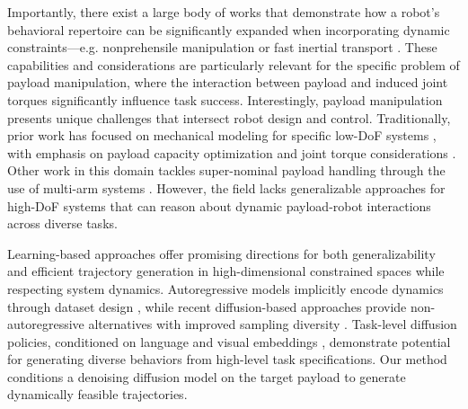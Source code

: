 Importantly, there exist a large body of works that demonstrate how a robot's behavioral repertoire can be significantly expanded when incorporating dynamic constraints---e.g. nonprehensile manipulation \cite{dogar2011framework,pasricha2022pokerrt,ruggiero2018nonprehensile,yu2016more,zeng2020tossingbot} or fast inertial transport \cite{arrizabalaga2024slosh,ichnowski2022gomp,muchacho2022solution,avigal2022gomp}.
These capabilities and considerations are particularly relevant for the specific problem of payload manipulation, where the interaction between payload and induced joint torques significantly influence task success.
Interestingly, payload manipulation presents unique challenges that intersect robot design and control.
Traditionally, prior work has focused on mechanical modeling for specific low-DoF systems \cite{wang2001payload}, with emphasis on payload capacity optimization \cite{korayem2008maximum} and joint torque considerations \cite{nho2003intelligent}. Other work in this domain tackles super-nominal payload handling through the use of multi-arm systems \cite{kim2021enhancing,yan2016coordinated}.
However, the field lacks generalizable approaches for high-DoF systems that can reason about dynamic payload-robot interactions across diverse tasks.

Learning-based approaches offer promising directions for both generalizability and efficient trajectory generation in high-dimensional constrained spaces while respecting system dynamics. Autoregressive models implicitly encode dynamics through dataset design \cite{fishman2023motion,qureshi2020motion}, while recent diffusion-based approaches provide non-autoregressive alternatives with improved sampling diversity \cite{carvalho2023motion,saha2024edmp}. Task-level diffusion policies, conditioned on language and visual embeddings \cite{ajay2023is,chi2023diffusionpolicy}, demonstrate potential for generating diverse behaviors from high-level task specifications.
Our method conditions a denoising diffusion model on the target payload to generate dynamically feasible trajectories.
